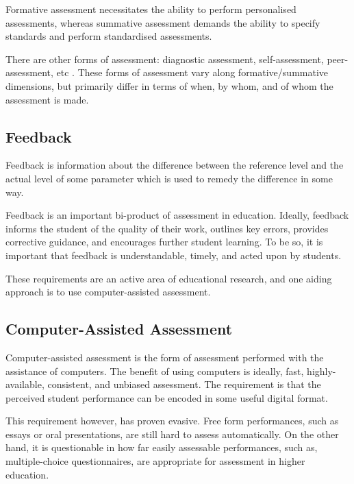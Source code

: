 Formative assessment necessitates the ability to perform personalised
assessments, whereas summative assessment demands the ability to specify
standards and perform standardised assessments.

There are other forms of assessment: diagnostic assessment, self-assessment,
peer-assessment, etc \cite{bull-mckenna-2004,topping-1998}.  These forms of
assessment vary along formative/summative dimensions, but primarily differ in
terms of when, by whom, and of whom the assessment is made.

\subsection{Feedback}

Feedback is information about the difference between the reference level and
the actual level of some parameter which is used to remedy the difference in
some way\cite{ramaprasad1989}.

Feedback is an important bi-product of assessment in
education\cite{black-william-1998}. Ideally, feedback informs the student of
the quality of their work, outlines key errors, provides corrective guidance,
and encourages further student learning. To be so, it is important that
feedback is understandable, timely, and acted upon by
students\cite{gibbs-simpson-2004}.

These requirements are an active area of educational research, and one aiding
approach is to use computer-assisted assessment.

\subsection{Computer-Assisted Assessment}

Computer-assisted assessment is the form of assessment performed with the
assistance of computers\cite{conole-warburton-2005}. The benefit of using
computers is ideally, fast, highly-available, consistent, and unbiased
assessment\cite{ala-mutka-2005}. The requirement is that the perceived student
performance can be encoded in some useful digital format.

This requirement however, has proven evasive. Free form performances, such as
essays or oral presentations, are still hard to assess
automatically\cite{valenti-et-al-2003}.  On the other hand, it is questionable
in how far easily assessable performances, such as, multiple-choice
questionnaires, are appropriate for assessment in higher
education\cite{conole-warburton-2005}.

